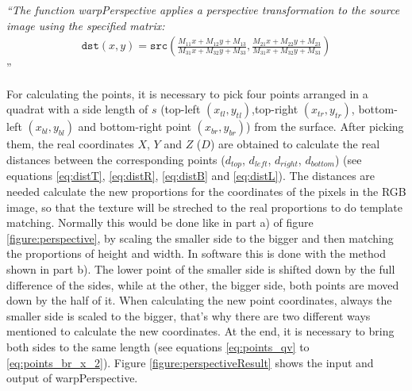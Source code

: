 \textit{
``The function warpPerspective applies a perspective transformation to the source image using the specified matrix:
\begin{gather}
\texttt{dst} (x,y) = \texttt{src} \left ( \frac{M_{11} x + M_{12} y + M_{13}}{M_{31} x + M_{32} y + M_{33}} , \frac{M_{21} x + M_{22} y + M_{23}}{M_{31} x + M_{32} y + M_{33}} \right ) 
\end{gather}
}''
\cite{willowgarage:opencv:warpPerspective} 

For calculating the points, it is necessary to pick four points arranged in a quadrat with a side length of $s$
(top-left $(x_{tl},y_{tl})$,top-right $(x_{tr},y_{tr})$, bottom-left $(x_{bl},y_{bl})$  and bottom-right point $(x_{br},y_{br})$) 
from the surface. 
After picking them, the real coordinates $X$, $Y$ and $Z$ ($D$) are obtained to calculate 
the real distances between the corresponding points ($d_{top}$, $d_{left}$, $d_{right}$, $d_{bottom}$)
(see equations \ref{eq:distT}, \ref{eq:distR}, \ref{eq:distB} and \vref{eq:distL}).
The distances are needed calculate the new proportions for the coordinates of the pixels in the RGB image, so that
the texture will be streched to the real proportions to do template matching. Normally this would be done like in
part a) of figure \vref{figure:perspective}, by scaling the smaller side to the bigger and then matching the proportions
of height and width. In software this is done with the method shown in part b). 
The lower point of the smaller side is shifted down by the full difference of the sides, while at the other, 
the bigger side, both points are moved down by the half of it. When calculating the new point coordinates,
always the smaller side is scaled to the bigger, that's why there are two different ways mentioned to 
calculate the new coordinates. At the end, it is necessary to bring both sides to the same length
(see equations \ref{eq:points_qv} to \vref{eq:points_br_x_2}). Figure \vref{figure:perspectiveResult}
shows the input and output of warpPerspective. 




